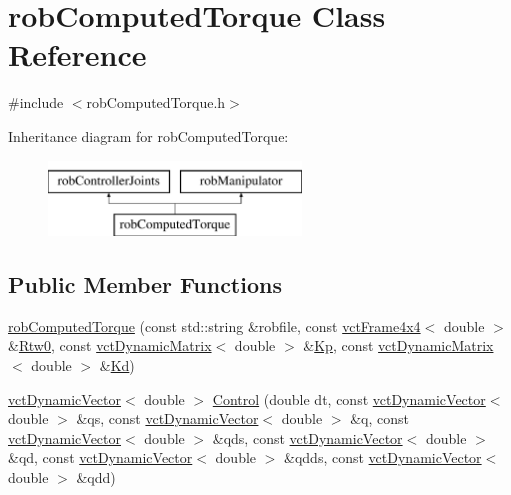 \hypertarget{classrob_computed_torque}{}\section{rob\+Computed\+Torque Class Reference}
\label{classrob_computed_torque}


{\ttfamily \#include $<$rob\+Computed\+Torque.\+h$>$}

Inheritance diagram for rob\+Computed\+Torque\+:\begin{figure}[H]
\begin{center}
\leavevmode
\includegraphics[height=2.000000cm]{d0/daa/classrob_computed_torque}
\end{center}
\end{figure}
\subsection*{Public Member Functions}
\begin{DoxyCompactItemize}
\item 
\hyperlink{classrob_computed_torque_a611038a87c486ab9735f2ca4e7981732}{rob\+Computed\+Torque} (const std\+::string \&robfile, const \hyperlink{classvct_frame4x4}{vct\+Frame4x4}$<$ double $>$ \&\hyperlink{classrob_manipulator_ab48d9d9a166bf252698bc35788ca6ad6}{Rtw0}, const \hyperlink{classvct_dynamic_matrix}{vct\+Dynamic\+Matrix}$<$ double $>$ \&\hyperlink{classrob_computed_torque_a11a6fdb06f86a2b81402c1c872c23484}{Kp}, const \hyperlink{classvct_dynamic_matrix}{vct\+Dynamic\+Matrix}$<$ double $>$ \&\hyperlink{classrob_computed_torque_acb199d8b884ccc02c1d47900c587eb79}{Kd})
\item 
\hyperlink{classvct_dynamic_vector}{vct\+Dynamic\+Vector}$<$ double $>$ \hyperlink{classrob_computed_torque_a7f861a30a5ee1a966fcfe0c41d58556d}{Control} (double dt, const \hyperlink{classvct_dynamic_vector}{vct\+Dynamic\+Vector}$<$ double $>$ \&qs, const \hyperlink{classvct_dynamic_vector}{vct\+Dynamic\+Vector}$<$ double $>$ \&q, const \hyperlink{classvct_dynamic_vector}{vct\+Dynamic\+Vector}$<$ double $>$ \&qds, const \hyperlink{classvct_dynamic_vector}{vct\+Dynamic\+Vector}$<$ double $>$ \&qd, const \hyperlink{classvct_dynamic_vector}{vct\+Dynamic\+Vector}$<$ double $>$ \&qdds, const \hyperlink{classvct_dynamic_vector}{vct\+Dynamic\+Vector}$<$ double $>$ \&qdd)
\end{DoxyCompactItemize}
